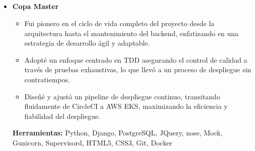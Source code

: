 \documentclass[11pt,a4paper,english]{moderncv}
\begin{document}
\subsection{}

{
    \begin{itemize}
        \item \textbf{Copa Master}
            \begin{itemize}
                \item Fui pionero en el ciclo de vida completo del proyecto desde la arquitectura hasta el mantenimiento del backend, enfatizando en una estrategia de desarrollo ágil y adaptable.
                \item Adopté un enfoque centrado en TDD asegurando el control de calidad a través de pruebas exhaustivas, lo que llevó a un proceso de despliegue sin contratiempos.
                \item Diseñé y ajustó un pipeline de despliegue continuo, transitando fluidamente de CircleCI a AWS EKS, maximizando la eficiencia y fiabilidad del despliegue.
            \end{itemize}
            \textbf{Herramientas:} Python, Django, PostgreSQL, JQuery, nose, Mock, Gunicorn, Supervisord, HTML5, CSS3, Git, Docker
    \end{itemize}
}

\subsection{}
\end{document}
